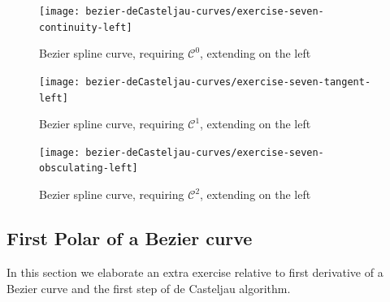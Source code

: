 \documentclass{article}
\begin{document}
\begin{figure}[h!]
  \centering
  \texttt{[image: bezier-deCasteljau-curves/exercise-seven-continuity-left]}
  \caption{Bezier spline curve, requiring $\mathcal{C}^0$, extending on the left}
  \label{fig:increasing-degree-does-change-curve}
\end{figure}

\begin{figure}[h!]
  \centering
  \texttt{[image: bezier-deCasteljau-curves/exercise-seven-tangent-left]}
  \caption{Bezier spline curve, requiring $\mathcal{C}^1$, extending on the left}
  \label{fig:increasing-degree-does-change-curve}
\end{figure}

\begin{figure}[h!]
  \centering
  \texttt{[image: bezier-deCasteljau-curves/exercise-seven-obsculating-left]}
  \caption{Bezier spline curve, requiring $\mathcal{C}^2$, extending on the left}
  \label{fig:increasing-degree-does-change-curve}
\end{figure}


\newpage

\subsection{First Polar of a Bezier curve}

In this section we elaborate an extra exercise relative to first derivative
of a Bezier curve and the first step of de Casteljau algorithm.
\end{document}
